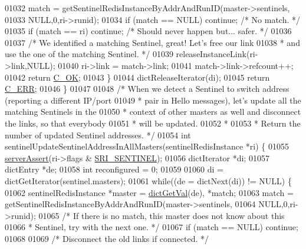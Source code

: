 \begin{DoxyCode}
{{{{{{{{{{{{{{{01032         match = getSentinelRedisInstanceByAddrAndRunID(master->sentinels,
01033                                                        NULL,0,ri->runid);
01034         \textcolor{keywordflow}{if} (match == NULL) \textcolor{keywordflow}{continue}; \textcolor{comment}{/* No match. */}
01035         \textcolor{keywordflow}{if} (match == ri) \textcolor{keywordflow}{continue}; \textcolor{comment}{/* Should never happen but... safer. */}
01036 
01037         \textcolor{comment}{/* We identified a matching Sentinel, great! Let's free our link}
01038 \textcolor{comment}{         * and use the one of the matching Sentinel. */}
01039         releaseInstanceLink(ri->link,NULL);
01040         ri->link = match->link;
01041         match->link->refcount++;
01042         \textcolor{keywordflow}{return} \hyperlink{server_8h_a303769ef1065076e68731584e758d3e1}{C\_OK};
01043     \}
01044     dictReleaseIterator(di);
01045     \textcolor{keywordflow}{return} \hyperlink{server_8h_af98ac28d5f4d23d7ed5985188e6fb7d1}{C\_ERR};
01046 \}
01047 
01048 \textcolor{comment}{/* When we detect a Sentinel to switch address (reporting a different IP/port}
01049 \textcolor{comment}{ * pair in Hello messages), let's update all the matching Sentinels in the}
01050 \textcolor{comment}{ * context of other masters as well and disconnect the links, so that everybody}
01051 \textcolor{comment}{ * will be updated.}
01052 \textcolor{comment}{ *}
01053 \textcolor{comment}{ * Return the number of updated Sentinel addresses. */}
01054 \textcolor{keywordtype}{int} sentinelUpdateSentinelAddressInAllMasters(sentinelRedisInstance *ri) \{
01055     \hyperlink{server_8h_a88114b5169b4c382df6b56506285e56a}{serverAssert}(ri->flags & \hyperlink{sentinel_8c_a8ed55207b2af5d2dd314c951ef253f64}{SRI\_SENTINEL});
01056     dictIterator *di;
01057     dictEntry *de;
01058     \textcolor{keywordtype}{int} reconfigured = 0;
01059 
01060     di = dictGetIterator(sentinel.masters);
01061     \textcolor{keywordflow}{while}((de = dictNext(di)) != NULL) \{
01062         sentinelRedisInstance *master = \hyperlink{dict_8h_ae8d2cc391873b2bea2b87c4f80f43120}{dictGetVal}(de), *match;
01063         match = getSentinelRedisInstanceByAddrAndRunID(master->sentinels,
01064                                                        NULL,0,ri->runid);
01065         \textcolor{comment}{/* If there is no match, this master does not know about this}
01066 \textcolor{comment}{         * Sentinel, try with the next one. */}
01067         \textcolor{keywordflow}{if} (match == NULL) \textcolor{keywordflow}{continue};
01068 
01069         \textcolor{comment}{/* Disconnect the old links if connected. */}
}}}}}}}}}}}}}}}
\end{DoxyCode}
